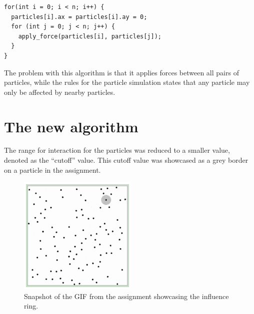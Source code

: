 \documentclass[a4paper,11pt,oneside]{book}
\begin{document}
\begin{verbatim}
for(int i = 0; i < n; i++) {
  particles[i].ax = particles[i].ay = 0;
  for (int j = 0; j < n; j++) {
    apply_force(particles[i], particles[j]);
  }
}
\end{verbatim}

The problem with this algorithm is that it applies forces between all pairs of particles, while the rules for the
particle simulation states that any particle may only be affected by nearby particles.

\section{The new algorithm}

The range for interaction for the particles was reduced to a smaller value, denoted as the ``cutoff'' value. This cutoff
value was showcased as a grey border on a particle in the assignment.

\begin{figure}[H]
  \centering
  \begin{minipage}[b]{0.4\textwidth}
    \includegraphics[width=\textwidth]{cutoff.png}
    \caption{Snapshot of the GIF from the assignment showcasing the influence ring.}
  \end{minipage}
\end{figure}
\end{document}

